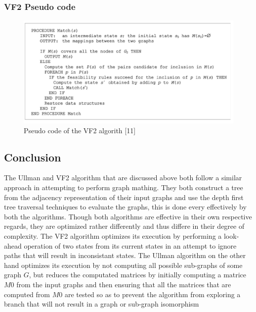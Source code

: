 \subsubsection{VF2 Pseudo code}
	\begin{figure}[H]
	  \begin{center}
		  \includegraphics[width=1.0\textwidth]{VF2pseudo}
	  \end{center}    
	  \caption{Pseudo code of the VF2 algorith [11]}
	  \label{fig:vf2pseudo}
	\end{figure} 

 \subsection{Conclusion}

 The Ullman and VF2 algorithm that are discussed above both follow a similar approach in attempting to perform graph mathing. They both construct a tree from the adjacency representation of their input graphs and use the depth first tree traversal techniques to evaluate the graphs, this is done every effectively by both the algorithms.\newline\newline
 Though both algorithms are effective in their own respective regards, they are optimized rather differently and thus differe in their degree of complexity. The VF2 algorithm optimizes its execution by performing a look-ahead operation of two states from its current states in an attempt to ignore paths that will result in inconsistant states.\newline\newline
 The Ullman algorithm on the other hand optimizes its execution by not computing all possible sub-graphs of some graph $G$, but reduces the computated matrices by initially computing a matrice $M0$ from the input graphs and then ensuring that all the matrices that are computed from $M0$ are tested so as to prevent the algorithm from exploring a branch that will not result in a graph or sub-graph isomorphism
\newpage

